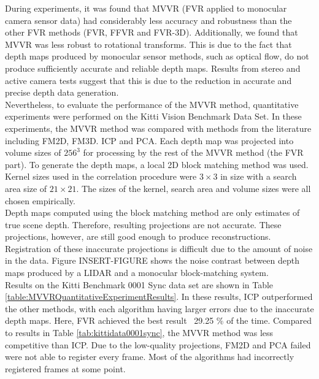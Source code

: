 
During experiments, it was found that MVVR (FVR applied to monocular camera sensor data) had considerably less accuracy and robustness than the other FVR methods (FVR, FFVR and FVR-3D). Additionally, we found that MVVR was less robust to rotational transforms. This is due to the fact that depth maps produced by monocular sensor methods, such as optical flow, do not produce sufficiently accurate and reliable depth maps. Results from stereo and active camera tests suggest that this is due to the reduction in accurate and precise depth data generation. \\

Nevertheless, to evaluate the performance of the MVVR method, quantitative experiments were performed on the Kitti Vision Benchmark Data Set. In these experiments, the MVVR method was compared with methods from the literature including FM2D, FM3D. ICP and PCA. Each depth map was projected into volume sizes of $256^3$ for processing by the rest of the MVVR method (the FVR part). To generate the depth maps, a local 2D block matching method was used. Kernel sizes used in the correlation procedure were $3 \times 3$ in size with a search area size of $21 \times 21$. The sizes of the kernel, search area and volume sizes were all chosen empirically. \\

Depth maps computed using the block matching method are only estimates of true scene depth. Therefore, resulting projections are not accurate. These projections, however, are still good enough to produce reconstructions. Registration of these inaccurate projections is difficult due to the amount of noise in the data. Figure INSERT-FIGURE shows the noise contrast between depth maps produced by a LIDAR and a monocular block-matching system. \\

Results on the Kitti Benchmark 0001 Sync data set are shown in Table \ref{table:MVVRQuantitativeExperimentResults}. In these results, ICP outperformed the other methods, with each algorithm having larger errors due to the inaccurate depth maps. Here, FVR achieved the best result ~29.25 \% of the time. Compared to results in Table \ref{tab:kittidata0001sync}, the MVVR method was less competitive than ICP. Due to the low-quality projections, FM2D and PCA failed were not able to register every frame. Most of the algorithms had incorrectly registered frames at some point.

